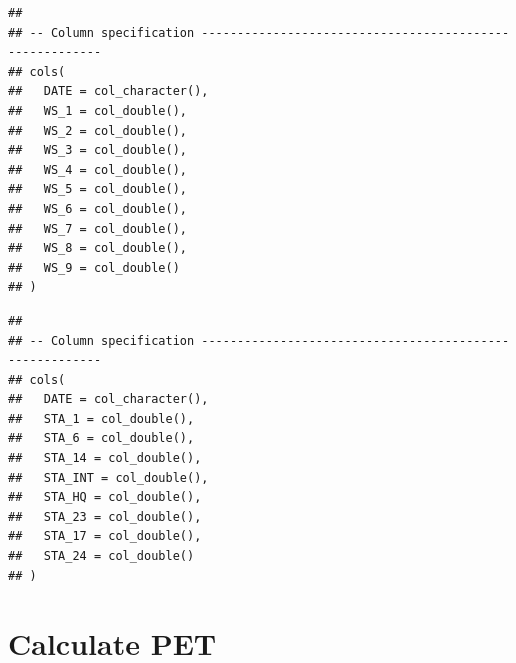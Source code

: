 \documentclass[
]{book}
\newenvironment{Shaded}{\begin{snugshade}}{\end{snugshade}}
\newcommand{\AttributeTok}[1]{\textcolor[rgb]{0.77,0.63,0.00}{#1}}
\newcommand{\CommentTok}[1]{\textcolor[rgb]{0.56,0.35,0.01}{\textit{#1}}}
\newcommand{\FunctionTok}[1]{\textcolor[rgb]{0.00,0.00,0.00}{#1}}
\newcommand{\NormalTok}[1]{#1}
\newcommand{\OtherTok}[1]{\textcolor[rgb]{0.56,0.35,0.01}{#1}}
\newcommand{\SpecialCharTok}[1]{\textcolor[rgb]{0.00,0.00,0.00}{#1}}
\newcommand{\StringTok}[1]{\textcolor[rgb]{0.31,0.60,0.02}{#1}}
\begin{document}
\begin{verbatim}
## 
## -- Column specification --------------------------------------------------------
## cols(
##   DATE = col_character(),
##   WS_1 = col_double(),
##   WS_2 = col_double(),
##   WS_3 = col_double(),
##   WS_4 = col_double(),
##   WS_5 = col_double(),
##   WS_6 = col_double(),
##   WS_7 = col_double(),
##   WS_8 = col_double(),
##   WS_9 = col_double()
## )
\end{verbatim}

\begin{Shaded}
\end{Shaded}

\begin{verbatim}
## 
## -- Column specification --------------------------------------------------------
## cols(
##   DATE = col_character(),
##   STA_1 = col_double(),
##   STA_6 = col_double(),
##   STA_14 = col_double(),
##   STA_INT = col_double(),
##   STA_HQ = col_double(),
##   STA_23 = col_double(),
##   STA_17 = col_double(),
##   STA_24 = col_double()
## )
\end{verbatim}

\begin{Shaded}
\end{Shaded}

\hypertarget{calculate-pet}{%
\section{Calculate PET}\label{calculate-pet}}
\end{document}

